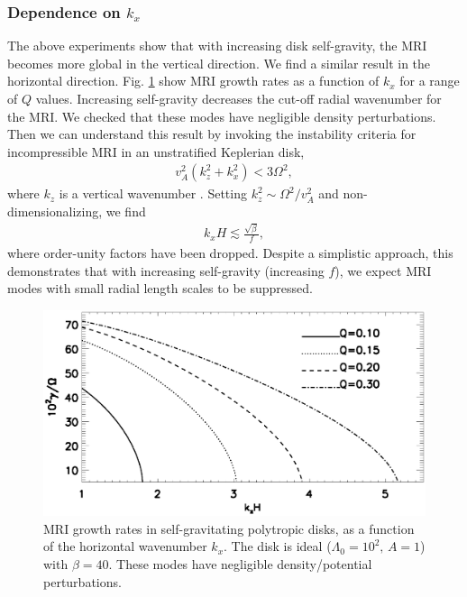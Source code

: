 \subsubsection{Dependence on $k_x$}
The above experiments show that with increasing 
disk self-gravity, the MRI becomes more global in the vertical
direction. We find a similar result in the horizontal direction. 
Fig. \ref{compare_growth_poly_kx} show MRI growth rates as a
function of $k_x$ for a range of $Q$ values. Increasing self-gravity
decreases the cut-off radial wavenumber for the MRI. We checked
that these modes have negligible density perturbations. Then we can 
understand this result by invoking the instability criteria for  
incompressible MRI in an unstratified Keplerian disk,
\begin{align}
  v_A^2(k_z^2 + k_x^2) < 3\Omega^2,
\end{align}
where $k_z$ is a vertical wavenumber \citep{kim00}. Setting $k_z^2\sim
\Omega^2/v_A^2$ and non-dimensionalizing, we find
\begin{align} 
  k_xH \lesssim \frac{\sqrt{\beta}}{f},
\end{align}
where order-unity factors have been dropped. Despite a simplistic
approach, this demonstrates that with increasing self-gravity
(increasing $f$), we expect MRI modes with small radial
length scales to be suppressed.   


 
\begin{figure}
  \includegraphics[width=\linewidth]{figures/compare_growth_poly_varQ_kx}
  \caption{MRI growth rates in self-gravitating polytropic disks, as a
    function of the horizontal wavenumber $k_x$. The disk is ideal
    ($\Lambda_0=10^2,\, A=1$) with $\beta = 40$. These modes have negligible
    density/potential perturbations.  
    \label{compare_growth_poly_kx}}
\end{figure}



